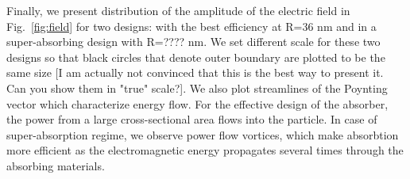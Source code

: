 \documentclass[aps,prl,twocolumn,showpacs,superscriptaddress,groupedaddress]{revtex4-1}
\begin{document}
\begin{figure}
\end{figure}
%
Finally, we present distribution of the amplitude of the electric
field in Fig.~\ref{fig:field} for two designs: with the best
efficiency at R=36 nm and in a super-absorbing design with R=???? nm.
We set different scale for these two designs so that black circles
that denote outer boundary are plotted to be the same size [I am
actually not convinced that this is the best way to present it. Can
you show them in "true" scale?].  We also plot streamlines of the
Poynting vector which characterize energy flow. For the effective
design of the absorber, the power from a large cross-sectional area
flows into the particle.  In case of super-absorption regime, we
observe power flow vortices, which make absorbtion more efficient as
the electromagnetic energy propagates several times through the
absorbing materials.




\end{document}
